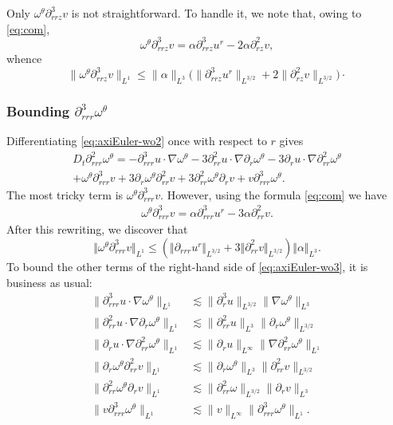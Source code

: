 \documentclass[11pt]{amsart}
\numberwithin{equation}{section}
\newcommand{\nrm}[1]{\Vert#1\Vert}
\def\d{\partial}
\newcommand{\nb}{\nabla}
\newcommand{\tht}{\theta}
\newcommand{\omg}{\omega}
\newcommand{\bfomg}{{\boldsymbol{\omega}}}
\begin{document}
Only $\omega^\theta\d^3_{rrz}v$ is not straightforward. To handle it, we note that, owing to \eqref{eq:com}, 
$$
\omega^\theta\d^3_{rrz}v=\alpha \d^3_{rrz} u^r -2 \alpha\d^2_{rz}  v ,$$
whence
$$\| \omega^\theta\d^3_{rrz}v\|_{L^1}\leq \|\alpha\|_{L^3} \bigl(\|\d^3_{rrz} u^r\|_{L^{3/2}}+2\|\d^2_{rz} v \|_{L^{3/2}}\bigr)\cdotp$$



\subsubsection*{Bounding  $\d^3_{rrr}\omega^\theta$} 
Differentiating  \eqref{eq:axiEuler-wo2} once with respect to $r$ gives
\begin{multline}\label{eq:axiEuler-wo3}
D_t\d^2_{rrr}\omega^\theta=  -\d^3_{rrr}u\cdot\nabla\omega^\theta-3\d^2_{rr}u\cdot\nabla\d_r\omega^\theta
-3\d_ru\cdot\nabla\d^2_{rr}\omega^\theta\\
+\omega^\theta\d^3_{rrr}v+3\d_r\omega^\theta\d^2_{rr}v+3\d^2_{rr}\omega^\theta\d_r v 
+ v\d^3_{rrr}\omega^\theta.
\end{multline}
The most  tricky term is  $	\omg^{\tht}\d^3_{rrr}v.$ However, using the formula \eqref{eq:com}
	 we have \begin{equation*}
		\begin{split}
			\omg^{\tht}\d^3_{rrr}v = \alpha\d^3_{rrr}u^{r}  - 3\alpha\d_{rr}^2v.
		\end{split}
	\end{equation*} After this rewriting,  we discover that
	\begin{equation*}
			\nrm{ \omg^{\tht}\d_{rrr}^3v }_{L^{1}} \le \left(  \nrm{ \d_{rrr} u^{r} }_{L^{3/2}} +3 \nrm{\d^2_{rr}v}_{L^{3/2}}  \right) \nrm{\alpha}_{L^{3}}.  
			\end{equation*}
To bound the other terms of the right-hand side of \eqref{eq:axiEuler-wo3}, it is business as usual:
\begin{align*}
\|\d^3_{rrr}u\cdot\nabla\omega^\theta\|_{L^1}&\lesssim \|\d^3_ru\|_{L^{3/2}}\|\nabla\omega^\theta\|_{L^3} \\
\|\d^2_{rr}u\cdot\nabla\d_r\omega^\theta\|_{L^1}&\lesssim \|\d^2_{rr}u\|_{L^3}\|\d_r\omega^\theta\|_{L^{3/2}} \\
\|\d_ru\cdot\nabla\d^2_{rr}\omega^\theta\|_{L^1}&\lesssim \|\d_ru\|_{L^\infty} \|\nabla\d^2_{rr}\omega^\theta\|_{L^1}\\
\|\d_r\omega^\theta\d^2_{rr}v\|_{L^1}&\lesssim \|\d_r\omega^\theta\|_{L^3}\|\d^2_{rr}v\|_{L^{3/2}}\\
\|\d^2_{rr}\omega^\theta\d_r v \|_{L^1}&\lesssim \|\d^2_{rr}\omega\|_{L^{3/2}}\|\d_r v \|_{L^3} \\
\|v\d^3_{rrr}\omega^\theta\|_{L^1}&\lesssim  \|v\|_{L^\infty}\|\d^3_{rrr}\omega^\theta\|_{L^1}.
\end{align*}
\end{document}
